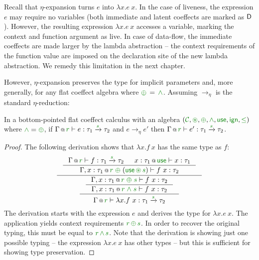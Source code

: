 Recall that $\eta$-expansion turns $e$ into $\lambda x.e~x$. In the case of liveness, the 
expression $e$ may require no variables (both immediate and latent coeffects are marked as
$\textnormal{\sffamily D}$). However, the resulting expression $\lambda x.e~x$ accesses a variable, 
marking the context and function argument as live. In case of data-flow, the immediate coeffects 
are made larger by the lambda abstraction -- the context requirements of the function value are 
imposed on the declaration site of the new lambda abstraction. We remedy this limitation in 
the next chapter.

However, $\eta$-expansion preserves the type for implicit parameters and, more generally,
for any flat coeffect algebra where $\cpar \,=\, \czip$. Assuming $\rightarrow_\eta$ is the 
standard $\eta$-reduction:

\begin{theorem}
In a bottom-pointed flat coeffect calculus with an algebra $(\C, \cseq, \cpar, \czip, \cunit, \czero, \cleq)$ 
where $\czip = \cpar$, if $\coctx{\Gamma}{\cclrd{r}} \vdash e : \tau_1 \xrightarrow{\cclrd{s}} \tau_2$ 
and $e \rightarrow_\eta e'$ then $\coctx{\Gamma}{\cclrd{r}} \vdash e' : \tau_1 \xrightarrow{\cclrd{s}} \tau_2 $.
\end{theorem}
\begin{proof}
The following derivation shows that $\lambda x.f~x$ has the same type as $f$:
\begin{equation*}
\inference
  { \inference
    { \coctx{\Gamma}{\cclrd{r}} \vdash f : \tau_1 \xrightarrow{\cclrd{s}} \tau_2 &
      \coctx{x:\tau_1}{\cunit} \vdash x:\tau_1 }
    { \coctx{\Gamma, x:\tau_1}{\cclrd{r} \;\cpar\; (\cunit \,\cseq\, \cclrd{s}) } \vdash f~x : \tau_2 } }
  { \inference
    { \inference
      { \coctx{\Gamma, x:\tau_1}{\cclrd{r} \;\cpar\; \cclrd{s} } \vdash f~x : \tau_2 }
      { \coctx{\Gamma, x:\tau_1}{\cclrd{r} \;\czip\; \cclrd{s} } \vdash f~x : \tau_2 } }
    { \coctx{\Gamma}{ \cclrd{r} } \vdash \lambda x.f~x : \tau_1 \xrightarrow{\cclrd{s}} \tau_2 } }
\end{equation*}
%
The derivation starts with the expression $e$ and derives the type for $\lambda x.e~x$. The
application yields context requirements $\cclrd{r}\,\cpar\,\cclrd{s}$. In order to recover the
original typing, this must be equal to $\cclrd{r}\,\czip\,\cclrd{s}$. Note that the derivation
is showing just one possible typing -- the expression $\lambda x.e~x$ has other types -- but
this is sufficient for showing type preservation.
\end{proof}

